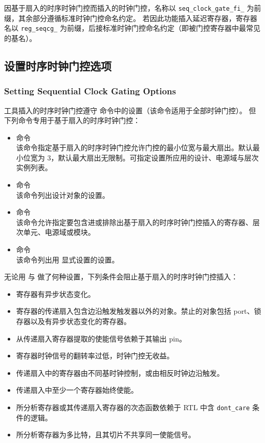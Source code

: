 因基于扇入的时序时钟门控而插入的时钟门控，名称以 \texttt{seq\_clock\_gate\_fi\_} 为前缀，其余部分遵循标准时钟门控命名约定。
若因此功能插入延迟寄存器，寄存器名以 \texttt{reg\_seqcg\_} 为前缀，后接标准时钟门控命名约定（即被门控寄存器中最常见的基名）。

\subsection{设置时序时钟门控选项}
\subsubsection*{Setting Sequential Clock Gating Options}

工具插入的时序时钟门控遵守  命令中的设置（该命令适用于全部时钟门控）。
但下列命令专用于基于扇入的时序时钟门控：
\begin{itemize}
  \item {} 命令\\
    该命令指定基于扇入的时序时钟门控允许门控的最小位宽与最大扇出。默认最小位宽为 3，默认最大扇出无限制。可指定设置所应用的设计、电源域与层次实例列表。
  \item {} 命令\\
    该命令列出设计对象的设置。
  \item {} 命令\\
    该命令允许指定要包含进或排除出基于扇入的时序时钟门控插入的寄存器、层次单元、电源域或模块。
  \item {} 命令\\
    该命令列出用  显式设置的设置。
\end{itemize}

无论用  与  做了何种设置，下列条件会阻止基于扇入的时序时钟门控插入：
\begin{itemize}
  \item 寄存器有异步状态变化。
  \item 寄存器的传递扇入包含边沿触发触发器以外的对象。禁止的对象包括 port、锁存器以及有异步状态变化的寄存器。
  \item 从传递扇入寄存器提取的使能信号依赖于其输出 pin。
  \item 寄存器时钟信号的翻转率过低，时钟门控无收益。
  \item 传递扇入中的寄存器由不同基时钟控制，或由相反时钟边沿触发。
  \item 传递扇入中至少一个寄存器始终使能。
  \item 所分析寄存器或其传递扇入寄存器的次态函数依赖于 RTL 中含 \texttt{dont\_care} 条件的逻辑。
  \item 所分析寄存器为多比特，且其切片不共享同一使能信号。
\end{itemize}

